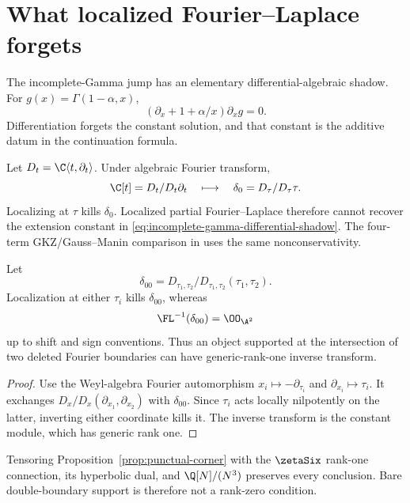 \section{What localized Fourier--Laplace forgets}
\label{sec:fourier-boundary}

The incomplete-Gamma jump has an elementary differential-algebraic shadow.
For \(g(x)=\Gamma(1-\alpha,x)\),
\begin{equation}\label{eq:incomplete-gamma-differential-shadow}
 (\partial_x+1+\alpha/x)\partial_xg=0.
\end{equation}
Differentiation forgets the constant solution, and that constant is the
additive datum in the continuation formula.

Let \(D_t=\C\langle t,\partial_t\rangle\).  Under algebraic Fourier transform,
\begin{equation}\label{eq:fourier-constant-delta}
 \C[t]=D_t/D_t\partial_t
 \quad\longmapsto\quad
 \delta_0=D_\tau/D_\tau\tau.
\end{equation}
Localizing at \(\tau\) kills \(\delta_0\).  Localized partial
Fourier--Laplace therefore cannot recover the extension constant in
\eqref{eq:incomplete-gamma-differential-shadow}.
The four-term GKZ/Gauss--Manin comparison in \cite{RSSW} uses the same
nonconservativity.

\begin{proposition}
\label{prop:punctual-corner}
Let
\[
 \delta_{00}=
 D_{\tau_1,\tau_2}/D_{\tau_1,\tau_2}(\tau_1,\tau_2).
\]
Localization at either \(\tau_i\) kills \(\delta_{00}\), whereas
\begin{equation}\label{eq:punctual-inverse-transform}
 \FL^{-1}(\delta_{00})=\OO_{\A^2}
\end{equation}
up to shift and sign conventions.  Thus an object supported at the
intersection of two deleted Fourier boundaries can have generic-rank-one
inverse transform.
\end{proposition}

\begin{proof}
Use the Weyl-algebra Fourier automorphism
\(x_i\mapsto-\partial_{\tau_i}\) and
\(\partial_{x_i}\mapsto\tau_i\).  It exchanges
\(D_x/D_x(\partial_{x_1},\partial_{x_2})\) with \(\delta_{00}\).
Since \(\tau_i\) acts locally nilpotently on the latter, inverting either
coordinate
kills it.  The inverse transform is the constant module, which has generic
rank one.
\end{proof}

Tensoring Proposition~\ref{prop:punctual-corner} with the
\(\zetaSix\) rank-one connection, its hyperbolic dual, and
\(\Q[N]/(N^3)\) preserves every conclusion.  Bare double-boundary support is
therefore not a rank-zero condition.

